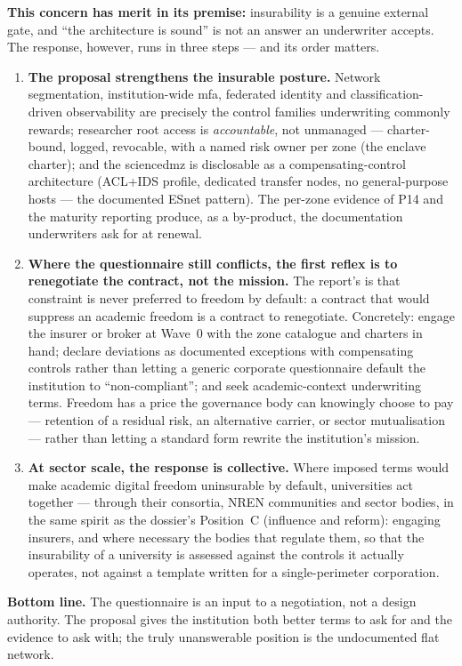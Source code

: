 \begin{answerbox}[Response Q9.5]
\textbf{This concern has merit in its premise:} insurability is a
genuine external gate, and ``the architecture is sound'' is not an
answer an underwriter accepts. The response, however, runs in three
steps --- and its order matters.

\begin{enumerate}[nosep]
  \item \textbf{The proposal strengthens the insurable posture.}
  Network segmentation, institution-wide \gls{mfa}, federated
  identity and classification-driven observability are precisely
  the control families underwriting commonly rewards; researcher
  root access is \emph{accountable}, not unmanaged --- charter-bound,
  logged, revocable, with a named risk owner per zone (the enclave
  charter); and the \gls{sciencedmz} is disclosable as a
  compensating-control architecture (ACL+IDS profile, dedicated
  transfer nodes, no general-purpose hosts --- the documented ESnet
  pattern). The per-zone evidence of P14 and the maturity reporting
  produce, as a by-product, the documentation underwriters ask for
  at renewal.

  \item \textbf{Where the questionnaire still conflicts, the first
  reflex is to renegotiate the contract, not the mission.} The
  report's  is that constraint is never
  preferred to freedom by default: a contract that would suppress an
  academic freedom is a contract to renegotiate. Concretely: engage the
  insurer or broker at Wave~0 with the zone catalogue and charters
  in hand; declare deviations as documented exceptions with
  compensating controls rather than letting a generic corporate
  questionnaire default the institution to ``non-compliant''; and
  seek academic-context underwriting terms. Freedom has a price the
  governance body can knowingly choose to pay --- retention of a
  residual risk, an alternative carrier, or sector mutualisation ---
  rather than letting a standard form rewrite the institution's
  mission.

  \item \textbf{At sector scale, the response is collective.} Where
  imposed terms would make academic digital freedom uninsurable by
  default, universities act together --- through their consortia,
  NREN communities and sector bodies, in the same spirit as the
  dossier's Position~C (influence and reform): engaging insurers,
  and where necessary the bodies that regulate them, so that the
  insurability of a university is assessed against the controls it
  actually operates, not against a template written for a
  single-perimeter corporation.
\end{enumerate}

\noindent\textbf{Bottom line.} The questionnaire is an input to a
negotiation, not a design authority. The proposal gives the
institution both better terms to ask for and the evidence to ask
with; the truly unanswerable position is the undocumented flat
network.
\end{answerbox}

